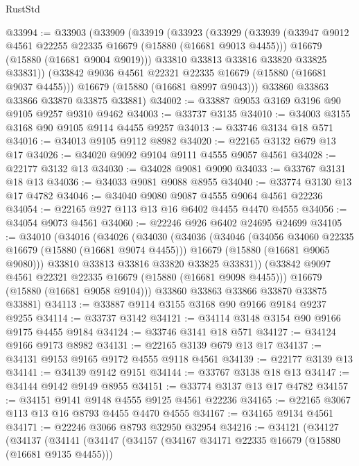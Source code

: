 \begin{lexlean}{RustStd}
\begin{coremodule}
@33994 := @33903
    (@33909
      (@33919
        (@33923
          (@33929
            (@33939
              (@33947 @9012 @4561 @22255 @22335 @16679 (@15880 (@16681 @9013 @4455)))
              @16679
              (@15880 (@16681 @9004 @9019)))
            @33810
            @33813
            @33816
            @33820
            @33825
            @33831))
        (@33842 @9036 @4561 @22321 @22335 @16679 (@15880 (@16681 @9037 @4455)))
        @16679
        (@15880 (@16681 @8997 @9043)))
      @33860
      @33863
      @33866
      @33870
      @33875
      @33881)
@34002 := @33887 @9053 @3169 @3196 @90 @9105 @9257 @9310 @9462
@34003 := @33737 @3135
@34010 := @34003 @3155 @3168 @90 @9105 @9114 @4455 @9257
@34013 := @33746 @3134 @18 @571
@34016 := @34013 @9105 @9112 @8982
@34020 := @22165 @3132 @679 @13 @17
@34026 := @34020 @9092 @9104 @9111 @4555 @9057 @4561
@34028 := @22177 @3132 @13
@34030 := @34028 @9081 @9090
@34033 := @33767 @3131 @18 @13
@34036 := @34033 @9081 @9088 @8955
@34040 := @33774 @3130 @13 @17 @4782
@34046 := @34040 @9080 @9087 @4555 @9064 @4561 @22236
@34054 := @22165 @927 @113 @13 @16 @6402 @4455 @4470 @4555
@34056 := @34054 @9073 @4561
@34060 := @22246 @926 @6402 @24695 @24699
@34105 := @34010
    (@34016
      (@34026
        (@34030
          (@34036
            (@34046
              (@34056 @34060 @22335 @16679 (@15880 (@16681 @9074 @4455)))
              @16679
              (@15880 (@16681 @9065 @9080)))
            @33810
            @33813
            @33816
            @33820
            @33825
            @33831))
        (@33842 @9097 @4561 @22321 @22335 @16679 (@15880 (@16681 @9098 @4455)))
        @16679
        (@15880 (@16681 @9058 @9104)))
      @33860
      @33863
      @33866
      @33870
      @33875
      @33881)
@34113 := @33887 @9114 @3155 @3168 @90 @9166 @9184 @9237 @9255
@34114 := @33737 @3142
@34121 := @34114 @3148 @3154 @90 @9166 @9175 @4455 @9184
@34124 := @33746 @3141 @18 @571
@34127 := @34124 @9166 @9173 @8982
@34131 := @22165 @3139 @679 @13 @17
@34137 := @34131 @9153 @9165 @9172 @4555 @9118 @4561
@34139 := @22177 @3139 @13
@34141 := @34139 @9142 @9151
@34144 := @33767 @3138 @18 @13
@34147 := @34144 @9142 @9149 @8955
@34151 := @33774 @3137 @13 @17 @4782
@34157 := @34151 @9141 @9148 @4555 @9125 @4561 @22236
@34165 := @22165 @3067 @113 @13 @16 @8793 @4455 @4470 @4555
@34167 := @34165 @9134 @4561
@34171 := @22246 @3066 @8793 @32950 @32954
@34216 := @34121
    (@34127
      (@34137
        (@34141
          (@34147
            (@34157
              (@34167 @34171 @22335 @16679 (@15880 (@16681 @9135 @4455)))

\end{coremodule}
\end{lexlean}
